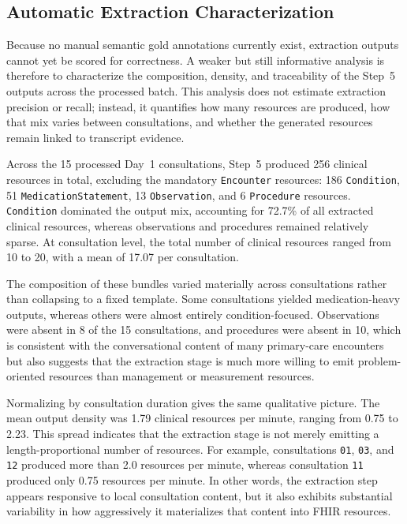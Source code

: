 \subsection{Automatic Extraction Characterization}

Because no manual semantic gold annotations currently exist, extraction outputs cannot yet be scored for correctness. A weaker but still informative analysis is therefore to characterize the composition, density, and traceability of the Step~5 outputs across the processed batch. This analysis does not estimate extraction precision or recall; instead, it quantifies how many resources are produced, how that mix varies between consultations, and whether the generated resources remain linked to transcript evidence.



Across the 15 processed Day~1 consultations, Step~5 produced 256 clinical resources in total, excluding the mandatory \texttt{Encounter} resources: 186 \texttt{Condition}, 51 \texttt{MedicationStatement}, 13 \texttt{Observation}, and 6 \texttt{Procedure} resources. \texttt{Condition} dominated the output mix, accounting for 72.7\% of all extracted clinical resources, whereas observations and procedures remained relatively sparse. At consultation level, the total number of clinical resources ranged from 10 to 20, with a mean of 17.07 per consultation.



The composition of these bundles varied materially across consultations rather than collapsing to a fixed template. Some consultations yielded medication-heavy outputs, whereas others were almost entirely condition-focused. Observations were absent in 8 of the 15 consultations, and procedures were absent in 10, which is consistent with the conversational content of many primary-care encounters but also suggests that the extraction stage is much more willing to emit problem-oriented resources than management or measurement resources.



Normalizing by consultation duration gives the same qualitative picture. The mean output density was 1.79 clinical resources per minute, ranging from 0.75 to 2.23. This spread indicates that the extraction stage is not merely emitting a length-proportional number of resources. For example, consultations \texttt{01}, \texttt{03}, and \texttt{12} produced more than 2.0 resources per minute, whereas consultation \texttt{11} produced only 0.75 resources per minute. In other words, the extraction step appears responsive to local consultation content, but it also exhibits substantial variability in how aggressively it materializes that content into FHIR resources.

